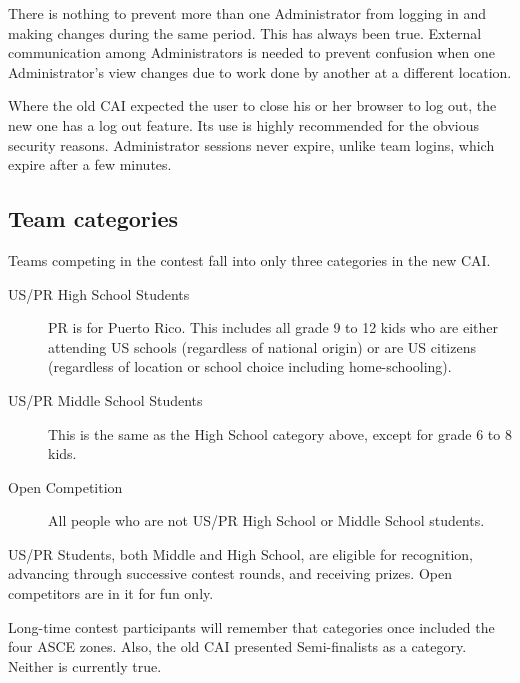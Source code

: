 \documentclass[11pt,letterpaper]{refart}
\begin{document}
There is nothing to prevent more than one Administrator from logging
in and making changes during the same period. This has always been
true.  External communication among Administrators is needed to
prevent confusion when one Administrator's view changes due to work
done by another at a different location.

Where the old CAI expected the user to close his or her browser to log
out, the new one has a log out feature. Its use is highly recommended
for the obvious security reasons. Administrator sessions never expire,
unlike team logins, which expire after a few minutes.

\subsection{Team categories}
Teams competing in the contest fall into only three categories in the
new CAI.
\begin{description}
\item[US/PR High School Students] PR is for Puerto Rico. This includes
  all grade 9 to 12 kids who are either attending US schools
  (regardless of national origin) or are US citizens (regardless of
  location or school choice including home-schooling).
\item[US/PR Middle School Students] This is the same as the High
  School category above, except for grade 6 to 8 kids.
\item[Open Competition] All people who are not US/PR High School or
  Middle School students.
\end{description}
US/PR Students, both Middle and High School, are eligible for
recognition, advancing through successive contest rounds, and
receiving prizes. Open competitors are in it for fun only.

Long-time contest participants will remember that categories once
included the four ASCE zones. Also, the old CAI presented
Semi-finalists as a category.  Neither is currently true.
\end{document}
